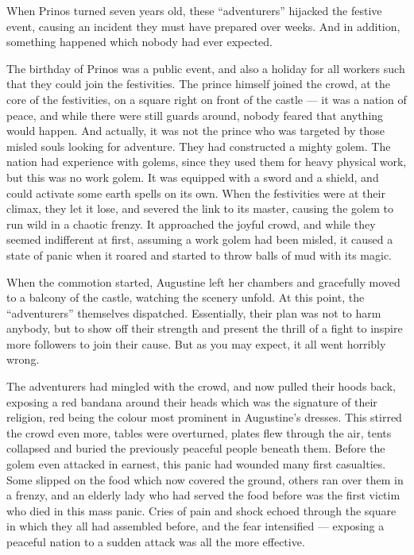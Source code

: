 When Prinos turned seven years old, these \enquote{adventurers} hijacked the festive event, causing an incident they must have prepared over weeks. And in addition, something happened which nobody had ever expected.

The birthday of Prinos was a public event, and also a holiday for all workers such that they could join the festivities. The prince himself joined the crowd, at the core of the festivities, on a square right on front of the castle --- it was a nation of peace, and while there were still guards around, nobody feared that anything would happen. And actually, it was not the prince who was targeted by those misled souls looking for adventure. They had constructed a mighty golem. The nation had experience with golems, since they used them for heavy physical work, but this was no work golem. It was equipped with a sword and a shield, and could activate some earth spells on its own. When the festivities were at their climax, they let it lose, and severed the link to its master, causing the golem to run wild in a chaotic frenzy. It approached the joyful crowd, and while they seemed indifferent at first, assuming a work golem had been misled, it caused a state of panic when it roared and started to throw balls of mud with its magic.

When the commotion started, Augustine left her chambers and gracefully moved to a balcony of the castle, watching the scenery unfold. At this point, the \enquote{adventurers} themselves dispatched. Essentially, their plan was not to harm anybody, but to show off their strength and present the thrill of a fight to inspire more followers to join their cause. But as you may expect, it all went horribly wrong.

The adventurers had mingled with the crowd, and now pulled their hoods back, exposing a red bandana around their heads which was the signature of their religion, red being the colour most prominent in Augustine's dresses. This stirred the crowd even more, tables were overturned, plates flew through the air, tents collapsed and buried the previously peaceful people beneath them. Before the golem even attacked in earnest, this panic had wounded many first casualties. Some slipped on the food which now covered the ground, others ran over them in a frenzy, and an elderly lady who had served the food before was the first victim who died in this mass panic. Cries of pain and shock echoed through the square in which they all had assembled before, and the fear intensified --- exposing a peaceful nation to a sudden attack was all the more effective.


